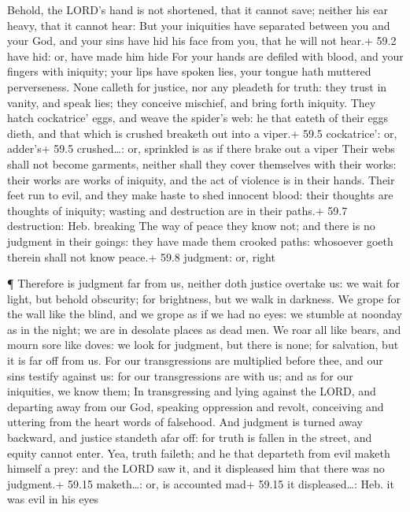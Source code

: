  Behold, the LORD's hand is not shortened, that it cannot
save; neither his ear heavy, that it cannot hear:  But your
iniquities have separated between you and your God, and your sins have
hid his face from you, that he will not hear.+ 59.2 have hid: or, have
made him hide  For your hands are defiled with blood, and
your fingers with iniquity; your lips have spoken lies, your tongue hath
muttered perverseness.  None calleth for justice, nor any
pleadeth for truth: they trust in vanity, and speak lies; they conceive
mischief, and bring forth iniquity.  They hatch cockatrice'
eggs, and weave the spider's web: he that eateth of their eggs dieth,
and that which is crushed breaketh out into a viper.+ 59.5 cockatrice':
or, adder's+ 59.5 crushed\ldots: or, sprinkled is as if there brake out
a viper  Their webs shall not become garments, neither shall
they cover themselves with their works: their works are works of
iniquity, and the act of violence is in their hands.  Their
feet run to evil, and they make haste to shed innocent blood: their
thoughts are thoughts of iniquity; wasting and destruction are in their
paths.+ 59.7 destruction: Heb. breaking  The way of peace
they know not; and there is no judgment in their goings: they have made
them crooked paths: whosoever goeth therein shall not know peace.+ 59.8
judgment: or, right

 ¶ Therefore is judgment far from us, neither doth justice
overtake us: we wait for light, but behold obscurity; for brightness,
but we walk in darkness.  We grope for the wall like the
blind, and we grope as if we had no eyes: we stumble at noonday as in
the night; we are in desolate places as dead men.  We roar
all like bears, and mourn sore like doves: we look for judgment, but
there is none; for salvation, but it is far off from us. 
For our transgressions are multiplied before thee, and our sins testify
against us: for our transgressions are with us; and as for our
iniquities, we know them;  In transgressing and lying
against the LORD, and departing away from our God, speaking oppression
and revolt, conceiving and uttering from the heart words of falsehood.
 And judgment is turned away backward, and justice standeth
afar off: for truth is fallen in the street, and equity cannot enter.
 Yea, truth faileth; and he that departeth from evil maketh
himself a prey: and the LORD saw it, and it displeased him that there
was no judgment.+ 59.15 maketh\ldots: or, is accounted mad+ 59.15 it
displeased\ldots: Heb. it was evil in his eyes

